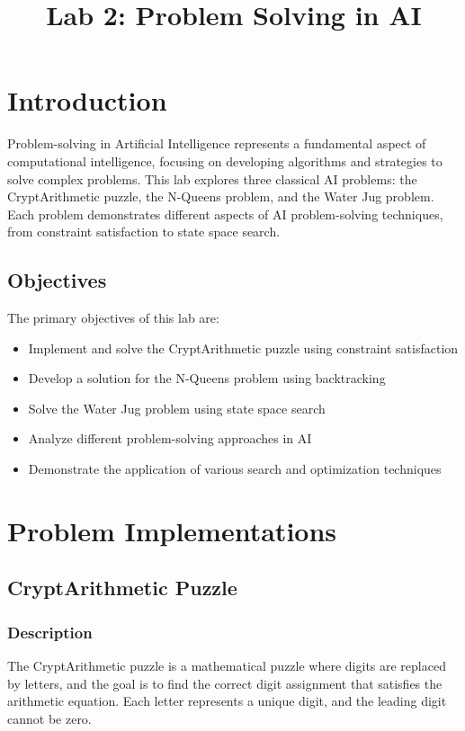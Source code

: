 \documentclass[11pt,a4paper]{article}
\title{Lab 2: Problem Solving in AI}
\author{}
\date{}
\begin{document}
\maketitle

\section{Introduction}

Problem-solving in Artificial Intelligence represents a fundamental aspect of computational intelligence, focusing on developing algorithms and strategies to solve complex problems. This lab explores three classical AI problems: the CryptArithmetic puzzle, the N-Queens problem, and the Water Jug problem. Each problem demonstrates different aspects of AI problem-solving techniques, from constraint satisfaction to state space search.

\subsection{Objectives}

The primary objectives of this lab are:
\begin{itemize}
    \item Implement and solve the CryptArithmetic puzzle using constraint satisfaction
    \item Develop a solution for the N-Queens problem using backtracking
    \item Solve the Water Jug problem using state space search
    \item Analyze different problem-solving approaches in AI
    \item Demonstrate the application of various search and optimization techniques
\end{itemize}

\section{Problem Implementations}

\subsection{CryptArithmetic Puzzle}

\subsubsection{Description}
The CryptArithmetic puzzle is a mathematical puzzle where digits are replaced by letters, and the goal is to find the correct digit assignment that satisfies the arithmetic equation. Each letter represents a unique digit, and the leading digit cannot be zero.
\end{document}
